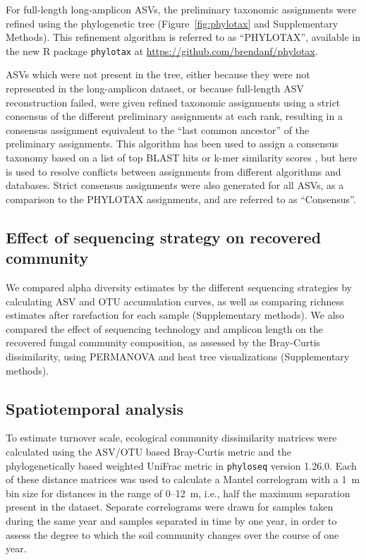 \documentclass[
  12pt,
]{article}
\begin{document}
For full-length long-amplicon ASVs, the preliminary taxonomic assignments were refined using the phylogenetic tree (Figure~\ref{fig:phylotax} and Supplementary Methods).
This refinement algorithm is referred to as ``PHYLOTAX'', available in the new R package \texttt{phylotax} at \url{https://github.com/brendanf/phylotax}.

ASVs which were not present in the tree, either because they were not represented in the long-amplicon dataset, or because full-length ASV reconstruction failed, were given refined taxonomic assignments using a strict consensus of the different preliminary assignments at each rank, resulting in a consensus assignment equivalent to the ``last common ancestor'' of the preliminary assignments.
This algorithm has been used to assign a consensus taxonomy based on a list of top BLAST hits \autocite[LCAClassifier,][]{lanzen2012} or k-mer similarity scores \autocite[mothur's k-nearest neighbor method,][]{schloss2009}, but here is used to resolve conflicts between assignments from different algorithms and databases.
Strict consensus assignments were also generated for all ASVs, as a comparison to the PHYLOTAX assignments, and are referred to as ``Consensus''.

\hypertarget{effect-of-sequencing-strategy-on-recovered-community}{%
\subsection{Effect of sequencing strategy on recovered community}\label{effect-of-sequencing-strategy-on-recovered-community}}

We compared alpha diversity estimates by the different sequencing strategies by calculating ASV and OTU accumulation curves, as well as comparing richness estimates after rarefaction for each sample (Supplementary methods).
We also compared the effect of sequencing technology and amplicon length on the recovered fungal community composition, as assessed by the Bray-Curtis dissimilarity, using PERMANOVA and heat tree visualizations (Supplementary methods).

\hypertarget{spatiotemporal-analysis}{%
\subsection{Spatiotemporal analysis}\label{spatiotemporal-analysis}}

To estimate turnover scale, ecological community dissimilarity matrices were calculated using the ASV/OTU based Bray-Curtis metric \autocite[for both long and short amplicons]{bray1957} and the phylogenetically based weighted UniFrac metric \autocites[for only long amplicons]{lozupone2005,lozupone2007} in \texttt{phyloseq} version 1.26.0.
Each of these distance matrices was used to calculate a Mantel correlogram with a 1~m bin size for distances in the range of 0--12~m, i.e., half the maximum separation present in the dataset.
Separate correlograms were drawn for samples taken during the same year and samples separated in time by one year, in order to assess the degree to which the soil community changes over the course of one year.
\end{document}
